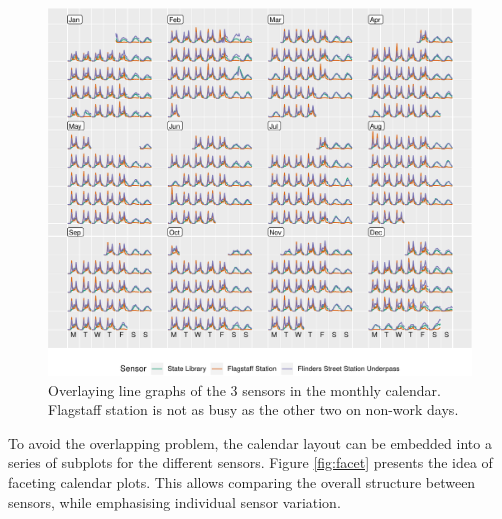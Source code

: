 \begin{Schunk}
\begin{figure}

{\centering \includegraphics[width=\textwidth]{figure/overlay-1} 

}

\caption[Overlaying line graphs of the 3 sensors in the monthly calendar]{Overlaying line graphs of the 3 sensors in the monthly calendar. Flagstaff station is not as busy as the other two on non-work days.}\label{fig:overlay}
\end{figure}
\end{Schunk}

To avoid the overlapping problem, the calendar layout can be embedded
into a series of subplots for the different sensors. Figure
\ref{fig:facet} presents the idea of faceting calendar plots. This
allows comparing the overall structure between sensors, while
emphasising individual sensor variation.

